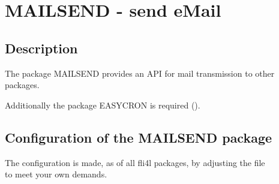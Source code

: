 

\section {MAILSEND - send eMail}

\subsection {Description}
    The package MAILSEND provides an API for mail transmission to other packages.
    
    Additionally the package EASYCRON is required ().

\subsection {Configuration of the MAILSEND package}

    The configuration is made, as of all fli4l packages, by adjusting the file\\
     to meet your own demands.

